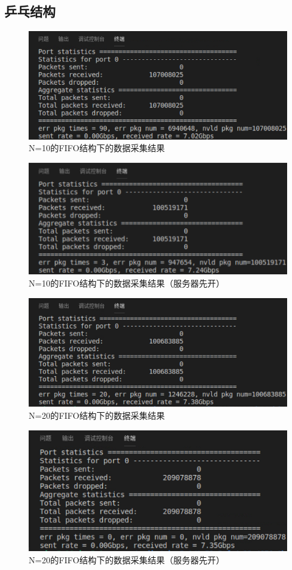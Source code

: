 \documentclass{article}
\begin{document}
\subsection{乒乓结构}
\begin{figure}[H]
	\centering
	\includegraphics[width = .8\textwidth]{res10.png}
	\caption{N=10的FIFO结构下的数据采集结果}
\end{figure}
\begin{figure}[H]
	\centering
	\includegraphics[width = .8\textwidth]{res10f.png}
	\caption{N=10的FIFO结构下的数据采集结果（服务器先开）}
\end{figure}
\begin{figure}[H]
	\centering
	\includegraphics[width = .8\textwidth]{res20.png}
	\caption{N=20的FIFO结构下的数据采集结果}
\end{figure}
\begin{figure}[H]
	\centering
	\includegraphics[width = .8\textwidth]{res20f.png}
	\caption{N=20的FIFO结构下的数据采集结果（服务器先开）}
\end{figure}
\end{document}
